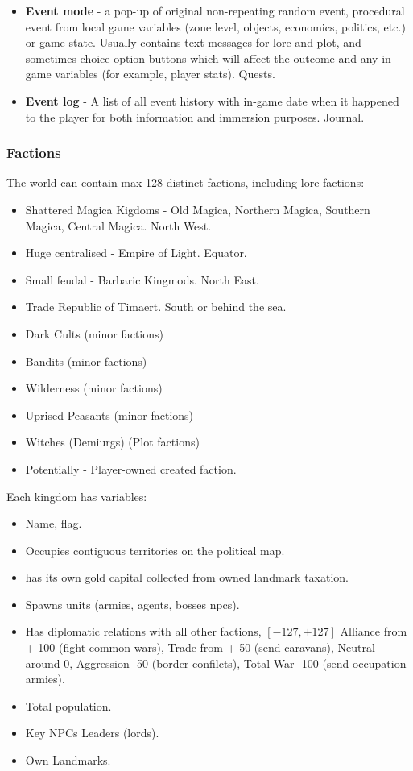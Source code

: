 \documentclass[a4paper,12pt]{article}
\begin{document}
\begin{itemize}
 \item \textbf{Event mode} - a pop-up of original non-repeating random event, procedural event from local game variables (zone level, objects, economics, politics, etc.) or game state. Usually contains text messages for lore and plot, and sometimes choice option buttons which will affect the outcome and any in-game variables (for example, player stats). Quests.
 
 \item  \textbf{Event log} - A list of all event history with in-game date when it happened to the player for both information and immersion purposes. Journal.
 
 \end{itemize}
 
\subsubsection{Factions}

The world can contain max 128 distinct factions, including lore factions:

\begin{itemize}
\item Shattered Magica Kigdoms - Old Magica, Northern Magica, Southern Magica, Central Magica. North West.
\item Huge centralised - Empire of Light. Equator.
\item Small feudal - Barbaric Kingmods. North East.
\item Trade Republic of Timaert. South or behind the sea.
\item Dark Cults (minor factions)
\item Bandits (minor factions)
\item Wilderness (minor factions) 
\item Uprised Peasants (minor factions)
\item Witches (Demiurgs) (Plot factions)
\item Potentially - Player-owned created faction.
\end{itemize}

Each kingdom has variables:

\begin{itemize}
\item Name, flag.
\item Occupies contiguous territories on the political map.
\item has its own gold capital collected from owned landmark taxation.
\item Spawns units (armies, agents, bosses npcs).
\item Has diplomatic relations with all other factions, $[-127, +127]$ Alliance from + 100 (fight common wars), Trade from + 50 (send caravans), Neutral around 0, Aggression -50 (border confilcts), Total War -100 (send occupation armies).
\item Total population.
\item Key NPCs Leaders (lords).
\item Own Landmarks.

\end{itemize}
\end{document}
